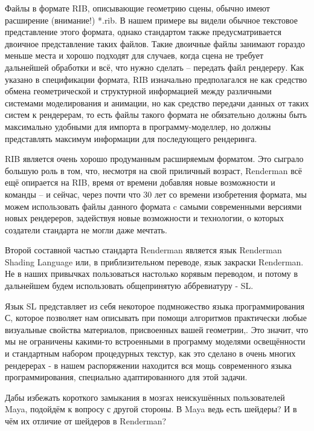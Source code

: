  Файлы в формате RIB, описывающие
    геометрию сцены, обычно имеют расширение (внимание!)
    *.rib. В нашем
    примере вы видели обычное текстовое представление этого формата,
    однако стандартом также предусматривается двоичное представление
    таких файлов. Такие двоичные файлы занимают гораздо меньше места и
    хорошо подходят для случаев, когда сцена не требует дальнейшей
    обработки и всё, что нужно сделать – передать файл рендереру. Как
    указано в спецификации формата, RIB изначально
    предполагался не как средство обмена геометрической и структурной
    информацией между различными системами моделирования и анимации, но
    как средство передачи данных от таких систем к рендерерам, то есть
    файлы такого формата не обязательно должны быть максимально
    удобными для импорта в программу-моделлер, но должны представлять
    максимум информации для последующего рендеринга.
  

 RIB является очень хорошо продуманным расширяемым форматом. Это
    сыграло большую роль в том, что, несмотря на свой приличный
    возраст, Renderman всё ещё опирается на RIB, время от
    времени добавляя новые возможности и команды – и сейчас, через
    почти что 30 лет со времени изобретения формата, мы можем
    использовать файлы данного формата c самыми
    современными версиями новых рендереров, задействуя новые
    возможности и технологии, о которых создатели стандарта не могли
    даже мечтать.
  

 Второй составной частью стандарта Renderman является язык Renderman Shading Language  или, в
    приблизительном переводе, язык закраски Renderman. Не в наших
    привычках пользоваться настолько корявым переводом, и потому в
    дальнейшем будем использовать общепринятую аббревиатуру - SL.
  

 Язык SL представляет из
    себя некоторое подмножество языка программирования С, которое
    позволяет нам описывать при помощи алгоритмов практически любые
    визуальные свойства материалов, присвоенных вашей геометрии,. Это
    значит, что мы не ограничены какими-то встроенными в программу
    моделями освещённости и стандартным набором процедурных текстур,
    как это сделано в очень многих рендерерах - в нашем распоряжении
    находится вся мощь современного языка программирования, специально
    адаптированного для этой задачи.
  

 Дабы избежать короткого замыкания в мозгах
    неискушённых пользователей Maya, подойдём к
    вопросу с другой стороны. В Maya ведь есть
    шейдеры? И в чём их отличие от шейдеров в Renderman?
  

